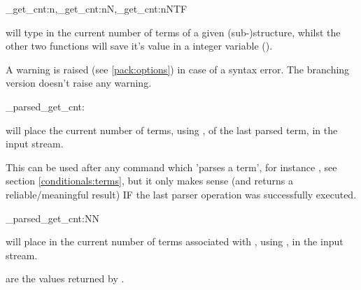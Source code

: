 \documentclass[10pt]{article}
\begin{document}
\begin{codedescribe}{\starray_get_cnt:n,\starray_get_cnt:nN,\starray_get_cnt:nNTF}
\begin{codesyntax}%
\end{codesyntax}
 will type in the current number of terms of a given (sub-)structure, whilst the other two functions will save it's value in a integer variable ().
\end{codedescribe}
\begin{tsremark}
A warning is raised (see \ref{pack:options}) in case of a  syntax error. The branching version doesn't raise any warning.
\end{tsremark}

\begin{codedescribe}[code,EXP,new=2023/05/20]{\starray_parsed_get_cnt:}
\begin{codesyntax}%
\end{codesyntax}
 will place the current number of terms, using , of the last parsed term, in the input stream.
\end{codedescribe}
\begin{tsremark}
This can be used after any command which 'parses a term', for instance , see section \ref{conditionals:terms}, but it only makes sense (and returns a reliable/meaningful result) IF the last parser operation was successfully executed.
\end{tsremark}

\begin{codedescribe}[code,EXP,new=2023/11/28]{\starray_parsed_get_cnt:NN}
\begin{codesyntax}%
\end{codesyntax}
 will place in the current number of terms associated with ,  using , in the input stream.
\end{codedescribe}
\begin{tsremark}
 are the values returned by .
\end{tsremark}
\end{document}
